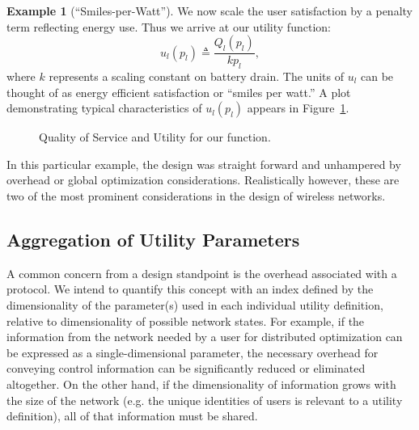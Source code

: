 \documentclass[11pt]{IEEEtran}
\theoremstyle{definition}
\newtheorem{example}{Example}
\begin{document}
\begin{example}[``Smiles-per-Watt'']
We now scale the user satisfaction by a penalty term reflecting energy use. Thus we arrive at our utility function:
\begin{equation}
  u_l(p_l) \triangleq \frac{Q_l(p_l)}{kp_l},
  \label{eq:util}
\end{equation}
where $k$ represents a scaling constant on battery drain.  The units of $u_l$ can be thought of as energy efficient satisfaction or ``smiles per watt.'' A plot demonstrating typical characteristics of $u_l(p_l)$ appears in Figure~\ref{fig:QoS}.


\begin{figure}[htp]
\begin{center}
\caption{Quality of Service and Utility for our function.}
\label{fig:QoS}
\end{center}
\end{figure}
\end{example}

In this particular example, the design was straight forward and unhampered by overhead or global optimization considerations.
Realistically however, these are two of the most prominent considerations in the design of wireless networks.

\subsection{Aggregation of Utility Parameters}
A common concern from a design standpoint is the overhead associated with a protocol. We intend to quantify this concept with an index defined by the dimensionality of the parameter(s) used in each individual utility definition, relative to dimensionality of possible network states. For example, if the information from the network needed by a user for distributed optimization can be expressed as a single-dimensional parameter, the necessary overhead for conveying control information can be significantly reduced or eliminated altogether. On the other hand, if the dimensionality of information grows with the size of the network (e.g. the unique identities of users is relevant to a utility definition), all of that information must be shared. 
\end{document}
